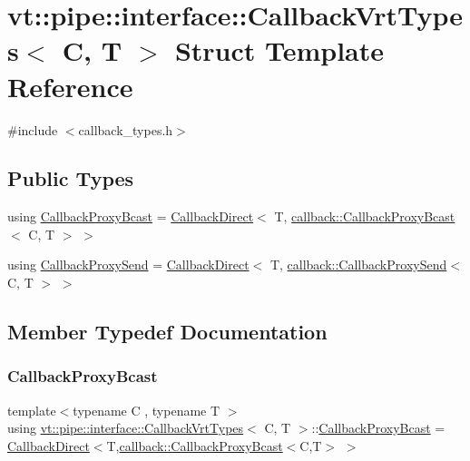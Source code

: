 \hypertarget{structvt_1_1pipe_1_1interface_1_1_callback_vrt_types}{}\section{vt\+:\+:pipe\+:\+:interface\+:\+:Callback\+Vrt\+Types$<$ C, T $>$ Struct Template Reference}
\label{structvt_1_1pipe_1_1interface_1_1_callback_vrt_types}


{\ttfamily \#include $<$callback\+\_\+types.\+h$>$}

\subsection*{Public Types}
\begin{DoxyCompactItemize}
\item 
using \hyperlink{structvt_1_1pipe_1_1interface_1_1_callback_vrt_types_a75738e0b98cb5c051a0649dcc1dfea05}{Callback\+Proxy\+Bcast} = \hyperlink{structvt_1_1pipe_1_1interface_1_1_callback_direct}{Callback\+Direct}$<$ T, \hyperlink{structvt_1_1pipe_1_1callback_1_1_callback_proxy_bcast}{callback\+::\+Callback\+Proxy\+Bcast}$<$ C, T $>$ $>$
\item 
using \hyperlink{structvt_1_1pipe_1_1interface_1_1_callback_vrt_types_abde4eb815f6fb701e5ffe86350cb67ee}{Callback\+Proxy\+Send} = \hyperlink{structvt_1_1pipe_1_1interface_1_1_callback_direct}{Callback\+Direct}$<$ T, \hyperlink{structvt_1_1pipe_1_1callback_1_1_callback_proxy_send}{callback\+::\+Callback\+Proxy\+Send}$<$ C, T $>$ $>$
\end{DoxyCompactItemize}


\subsection{Member Typedef Documentation}
\mbox{\label{structvt_1_1pipe_1_1interface_1_1_callback_vrt_types_a75738e0b98cb5c051a0649dcc1dfea05}} 
\subsubsection{\texorpdfstring{Callback\+Proxy\+Bcast}{CallbackProxyBcast}}
{\footnotesize\ttfamily template$<$typename C , typename T $>$ \\
using \hyperlink{structvt_1_1pipe_1_1interface_1_1_callback_vrt_types}{vt\+::pipe\+::interface\+::\+Callback\+Vrt\+Types}$<$ C, T $>$\+::\hyperlink{structvt_1_1pipe_1_1interface_1_1_callback_vrt_types_a75738e0b98cb5c051a0649dcc1dfea05}{Callback\+Proxy\+Bcast} =  \hyperlink{structvt_1_1pipe_1_1interface_1_1_callback_direct}{Callback\+Direct}$<$T,\hyperlink{structvt_1_1pipe_1_1callback_1_1_callback_proxy_bcast}{callback\+::\+Callback\+Proxy\+Bcast}$<$C,T$>$ $>$}

